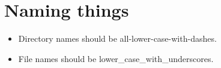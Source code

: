 \section{Naming things}

\begin{itemize}
\item Directory names should be all-lower-case-with-dashes.
\item File names should be lower_case_with_underscores.
\end{itemize}
